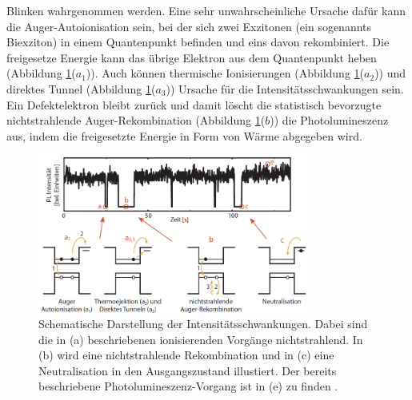 Blinken wahrgenommen werden. Eine sehr unwahrscheinliche Ursache dafür kann die
Auger-Autoionisation sein, bei der sich zwei Exzitonen (ein sogenannts Biexziton)
in einem Quantenpunkt befinden und eins davon rekombiniert. Die freigesetze Energie
kann das übrige Elektron aus dem Quantenpunkt heben (Abbildung \ref{fig:blink}($a_1$)).
Auch können thermische Ionisierungen (Abbildung \ref{fig:blink}($a_2$)) und
direktes Tunnel (Abbildung \ref{fig:blink}($a_3$)) Ursache für die
Intensitätsschwankungen sein. Ein Defektelektron bleibt zurück und damit löscht
die statistisch bevorzugte nichtstrahlende Auger-Rekombination (Abbildung
\ref{fig:blink}($b$)) die Photolumineszenz aus, indem die freigesetzte Energie in
Form von Wärme abgegeben wird.

\begin{figure}[hbtp]
	\centering
	\includegraphics[width=0.8\textwidth]{Abb/blink.png}
	\caption{Schematische Darstellung der Intensitätsschwankungen. Dabei sind die
	in (a) beschriebenen ionisierenden Vorgänge nichtstrahlend. In (b) wird eine
	nichtstrahlende Rekombination und in (c) eine Neutralisation in den Ausgangszustand
	illustiert. Der bereits beschriebene Photolumineszenz-Vorgang ist in (e) zu finden
	\cite{blink}.}
	\label{fig:blink}
\end{figure}
\noindent

